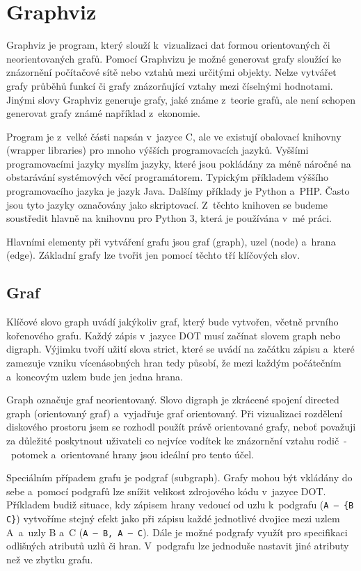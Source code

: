 \documentclass[color,table,oneside,nolot,nolof]{fithesis}
\begin{document}
\section{Graphviz}
	Graphviz je program, který slouží k~vizualizaci dat formou orientovaných či neorientovaných grafů\cite{graphviz}. Pomocí Graphvizu je možné generovat grafy sloužící ke znázornění počítačové sítě nebo
	vztahů mezi určitými objekty. Nelze vytvářet grafy průběhů funkcí či grafy znázorňující vztahy mezi číselnými hodnotami. Jinými slovy Graphviz generuje grafy, jaké známe z~teorie grafů,
	ale není schopen generovat grafy známé například z~ekonomie.

	Program je z~velké části napsán v~jazyce C, ale ve existují obalovací knihovny (wrapper libraries) pro mnoho výšších programovacích jazyků. Vyššími 
	programovacími jazyky myslím jazyky, které jsou pokládány za méně náročné na obstarávání systémových věcí programátorem. Typickým příkladem výššího 
	programovacího jazyka je jazyk Java. Dalšímy příklady je Python a~PHP. Často jsou tyto jazyky označovány jako skriptovací. 
	Z~těchto knihoven se budeme soustředit hlavně na knihovnu pro Python 3, která je používána v~mé práci.

	Hlavními elementy při vytváření grafu jsou graf (graph), uzel (node) a~hrana (edge). Základní grafy lze tvořit jen pomocí těchto tří klíčových slov.

\subsection{Graf}
	Klíčové slovo graph uvádí jakýkoliv graf, který bude vytvořen, včetně prvního kořenového grafu. Každý zápis v~jazyce DOT musí začínat slovem graph nebo digraph\cite{digraph}. Výjimku tvoří užití slova
	strict, které se uvádí na začátku zápisu a~které zamezuje vzniku vícenásobných hran tedy působí, že  mezi každým počátečním a~koncovým uzlem bude jen jedna hrana. 

	Graph označuje graf neorientovaný. Slovo digraph je zkrácené spojení directed graph (orientovaný
	graf) a~vyjadřuje graf orientovaný. Při vizualizaci rozdělení diskového prostoru jsem se rozhodl použít právě orientované grafy, neboť považuji za 
	důležité poskytnout uživateli co nejvíce vodítek ke znázornění vztahu rodič~-~potomek a~orientované hrany jsou ideální pro tento účel. 

	Speciálním případem grafu je podgraf (subgraph). Grafy mohou být vkládány do sebe a~pomocí podgrafů lze snížit velikost zdrojového kódu v~jazyce DOT. Příkladem budiž situace, kdy zápisem
	hrany vedoucí od uzlu k~podgrafu (\texttt{A~--~\{B C\}}) vytvoříme stejný efekt jako při zápisu každé jednotlivé dvojice mezi uzlem A~a~uzly B a~C (\texttt{A~--~B, A~--~C}). Dále je možné podgrafy využít
	pro specifikaci odlišných atributů uzlů či hran. V~podgrafu lze jednoduše nastavit jiné atributy než ve zbytku grafu.
\end{document}
